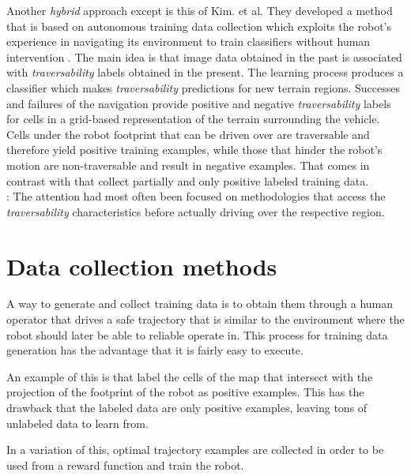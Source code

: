 \documentclass[12pt,a4paper]{report}
\newcommand{\term}{\textit}
\begin{document}
	Another \term{hybrid} approach except \cite{Shneier} is this of Kim. et al. They 
	developed a method that is based on autonomous training data collection which 
	exploits the robot’s experience in navigating its environment to train 
	classifiers without human intervention \cite{Kim}.  The main idea is that image 
	data obtained in the past is associated with \term{traversability} labels 
	obtained in the present. The learning process produces a classifier which makes 
	\term{traversability} predictions for new terrain regions. Successes and failures 
	of the navigation provide positive and negative \term{traversability} labels for 
	cells in a grid-based representation of the terrain surrounding the vehicle. 
	Cells under the robot footprint that can be driven over are traversable and 
	therefore yield positive training examples, while those that hinder the robot’s 
	motion are non-traversable and result in negative examples. That comes in 
	contrast with \cite{Suger} that collect partially and only positive labeled 
	training data.
	\\
	
	


	\cite{Papadakis}: The attention had most often been focused on methodologies that access the 
	\term{traversability} characteristics before actually driving over the respective 
	region.
	\\
	
	\section{Data collection methods}
	\label{sec:bg:data}
	
	A way to generate and collect training data is to obtain them through a human 
	operator that drives a safe trajectory that is similar to the environment where 
	the robot should later be able to reliable operate in. This process for training 
	data generation has the advantage that it is fairly easy to execute.
	\par 
	An example of this is \cite{Suger} that label the cells of the map that 
	intersect with the projection of the footprint of the robot as positive examples. 
	This has the drawback that the labeled data are only positive examples, leaving 
	tons of unlabeled data to learn from.
	\par 
	In a variation of this, optimal trajectory examples are collected \cite{Wigness} 
	in order to be used from a reward function and train the robot.
	\\
	
\end{document}
